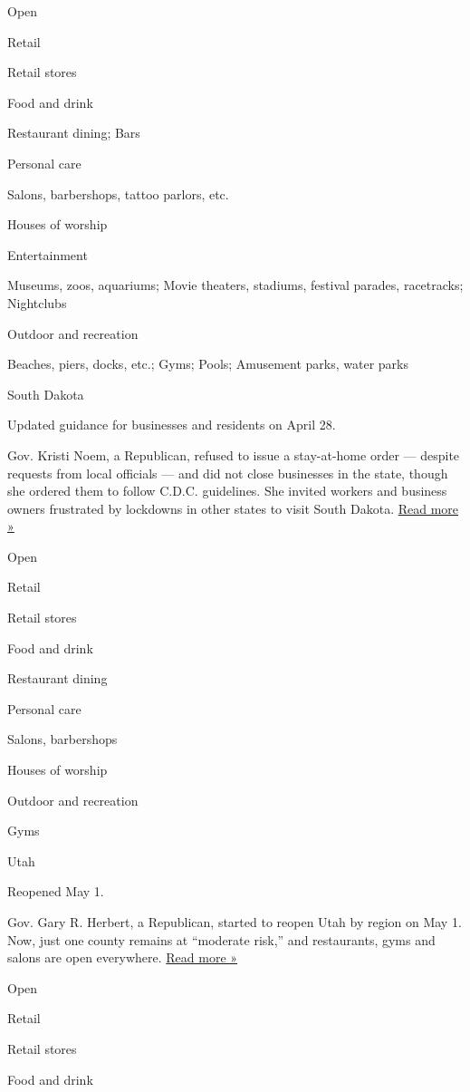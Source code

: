 Open

Retail

Retail stores

Food and drink

Restaurant dining; Bars

Personal care

Salons, barbershops, tattoo parlors, etc.

Houses of worship

Entertainment

Museums, zoos, aquariums; Movie theaters, stadiums, festival parades,
racetracks; Nightclubs

Outdoor and recreation

Beaches, piers, docks, etc.; Gyms; Pools; Amusement parks, water parks

South Dakota

Updated guidance for businesses and residents on April 28.

Gov. Kristi Noem, a Republican, refused to issue a stay-at-home order
--- despite requests from local officials --- and did not close
businesses in the state, though she ordered them to follow C.D.C.
guidelines. She invited workers and business owners frustrated by
lockdowns in other states to visit South Dakota.
\href{https://www.usnews.com/news/best-states/south-dakota/articles/2020-04-28/south-dakota-governor-to-unveil-plan-to-reopen-state}{Read
more »}

Open

Retail

Retail stores

Food and drink

Restaurant dining

Personal care

Salons, barbershops

Houses of worship

Outdoor and recreation

Gyms

Utah

Reopened May 1.

Gov. Gary R. Herbert, a Republican, started to reopen Utah by region on
May 1. Now, just one county remains at ``moderate risk,'' and
restaurants, gyms and salons are open everywhere.
\href{https://www.sltrib.com/news/2020/04/28/utah-will-begin-easing/}{Read
more »}

Open

Retail

Retail stores

Food and drink

